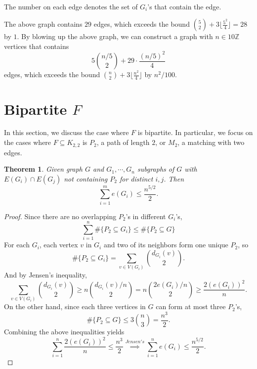 \documentclass[12pt]{report}
\newtheorem{theorem}{Theorem}[chapter]
\begin{document}
\begin{center}
  \\
  \small{The number on each edge denotes the set of $G_i$'s that contain the edge.}
\end{center}
The above graph contains $29$ edges, which exceeds the bound $\binom{5}{2} + 3 \lfloor \frac{5^2}{4}
\rfloor = 28$ by $1$. By blowing up the above graph, we can construct a graph with $n \in
10\mathbb{Z}$ vertices that contains
\[
  5\binom{n/5}{2} + 29 \cdot \frac{(n/5)^2}{4}
\]
edges, which exceeds the bound $\binom{n}{2} + 3\lfloor\frac{n^2}{4}\rfloor$ by $n^2/100$. 

\section{Bipartite $F$}

In this section, we discuss the case where $F$ is bipartite. In particular, we focus on the cases
where $F \subseteq K_{2, 2}$ is $P_2$, a path of length $2$, or $M_2$, a matching with two edges.

\begin{theorem}
  Given graph $G$ and $G_1, \cdots, G_n$ subgraphs of $G$ with $E(G_i) \cap E(G_j)$ not containing
  $P_2$ for distinct $i, j$. Then
  \[
    \sum_{i = 1}^m e(G_i) \leq \frac{n^{5/2}}{2}.
  \]
\end{theorem}

\begin{proof}
  Since there are no overlapping $P_2$'s in different $G_i$'s, 
  \[
    \sum_{i = 1}^n \#\{P_2 \subseteq G_i\} \leq \#\{P_2 \subseteq G\}
  \]
  For each $G_i$, each vertex $v$ in $G_i$ and two of its neighbors form one unique $P_2$, so
  \[
    \#\{P_2 \subseteq G_i\} = \sum_{v \in V(G_i)} \binom{d_{G_i}(v)}{2}.
  \]
  And by Jensen's inequality,
  \[
    \sum_{v \in V(G_i)} \binom{d_{G_i}(v)}{2} \geq n\binom{d_{G_i}(v)/n}{2} = n\binom{2e(G_i)/n}{2} \geq \frac{2(e(G_i))^2}{n}.
  \]
  On the other hand, since each three vertices in $G$ can form at most three $P_2$'s, 
  \[
    \#\{P_2 \subseteq G\} \leq 3\binom{n}{3} = \frac{n^3}{2}.
  \]
  Combining the above inequalities yields
  \[
    \sum_{i = 1}^n \frac{2(e(G_i))^2}{n} \leq \frac{n^3}{2} \overset{Jensen's}{\implies} \sum_{i = 1}^n e(G_i) \leq \frac{n^{5/2}}{2}.
  \]
\end{proof}
\end{document}
